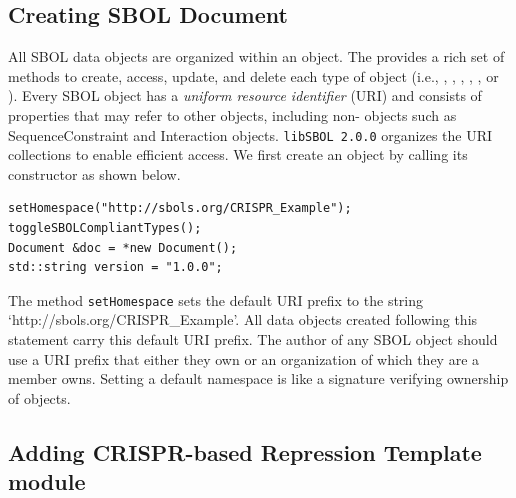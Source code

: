 

\subsection*{Creating SBOL Document}
 All SBOL data objects are organized within an  object. The  provides a rich set of methods to create, access, update, and delete each type of  object (i.e., , , , , , or ). Every SBOL object has a \emph{uniform resource identifier} (URI) and consists of properties that may refer to other objects, including non- objects such as SequenceConstraint and Interaction objects. \texttt{libSBOL 2.0.0} organizes the URI collections to enable efficient access. We first create an  object by calling its constructor as shown below.

\begin{minipage}{0.95\textwidth} 
\begin{lstlisting}
setHomespace("http://sbols.org/CRISPR_Example");
toggleSBOLCompliantTypes();
Document &doc = *new Document();
std::string version = "1.0.0";
\end{lstlisting}
\end{minipage}

The method \lstinline+setHomespace+ sets the
default URI prefix to the string  `http://sbols.org/CRISPR\_Example'. All data objects created following this statement carry this default URI prefix. The author of any SBOL object should use a URI prefix that either they own or an organization of which they are a member owns. Setting a default namespace is like a signature verifying ownership of objects. 

\subsection*{Adding CRISPR-based Repression Template module}
